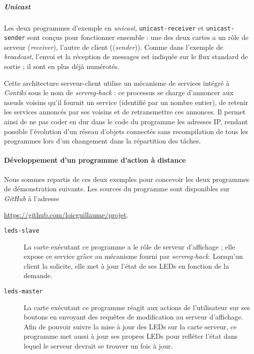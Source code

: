 \subparagraph{\textit{Unicast}}

Les deux programmes d’exemple en \textit{unicast}, \texttt{unicast-receiver} et \texttt{unicast-sender} sont conçus pour fonctionner ensemble : une des deux cartes a un rôle de serveur (\textit{receiver}), l’autre de client ((\textit{sender})).
Comme dans l’exemple de \textit{broadcast}, l’envoi et la réception de messages est indiquée sur le flux standard de sortie ; il sont en plus déjà numérotés.

Cette architecture serveur-client utilise un mécanisme de services intégré à \emph{Contiki} sous le nom de \emph{servreg-hack}  : ce processus se charge d’annoncer aux nœuds voisins qu’il fournit un service (identifié par un nombre entier), de retenir les services annoncés par ses voisins et de retransmettre ces annonces.
Il permet ainsi de ne pas coder en dur dans le code du programme les adresses IP, rendant possible l’évolution d’un réseau d’objets connectés sans recompilation de tous les programmes lors d’un changement dans la répartition des tâches.

\paragraph{Développement d’un programme d’action à distance}

Nous sommes repartis de ces deux exemples pour concevoir les deux programmes de démonstration suivants. Les sources du programme sont disponibles sur \emph{GitHub} à l’adresse
\begin{center}
\url{https://github.com/loicguillaume/projet}.
\end{center}

\begin{description}
	\item[\texttt{leds-slave}]
		La carte exécutant ce programme a le rôle de serveur d’affichage ; elle expose ce service grâce au mécanisme fourni par \emph{servreg-hack}.
		Lorsqu’un client la solicite, elle met à jour l’état de ses LEDs en fonction de la demande.
	\item[\texttt{leds-master}]
		La carte exécutant ce programme réagit aux actions de l’utilisateur sur ses boutons en envoyant des requêtes de modification au serveur d’affichage.
		Afin de pouvoir suivre la mise à jour des LEDs sur la carte serveur, ce programme met aussi à jour ses propres LEDs pour refléter l’état dans lequel le serveur devrait se trouver un fois à jour.
\end{description}

